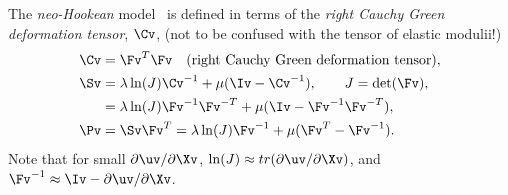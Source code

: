 The {\em neo-Hookean} model~\cite{Belytschko2005} is defined in terms of the {\em right Cauchy Green deformation tensor}, $\Cv$, (not
to be confused with the tensor of elastic modulii!)
\begin{align}
   \Cv &= \Fv^T\Fv \quad\text{(right Cauchy Green deformation tensor)},\\
   \Sv &= \lambda \ln(J) \Cv^{-1} + \mu( \Iv - \Cv^{-1} ), \qquad J =\det(\Fv), \\
       &= \lambda \ln(J) \Fv^{-1}\Fv^{-T} + \mu( \Iv - \Fv^{-1}\Fv^{-T} ) , \\
   \Pv &= \Sv \Fv^T =  \lambda \ln(J) \Fv^{-1} + \mu( \Fv^T - \Fv^{-1} ) .
\end{align}
Note that for small $\partial \uv/\partial\Xv$, $\ln(J)\approx tr(\partial \uv/\partial\Xv)$,
and $\Fv^{-1} \approx \Iv - \partial\uv/\partial\Xv$. 


